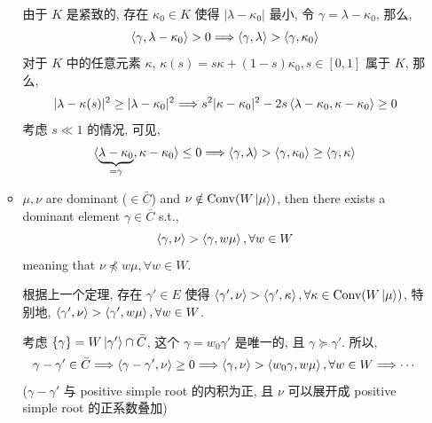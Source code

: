 \begin{itemize}
\begin{itemize}
		\begin{tcolorbox}[title=proof:]
			由于 $K$ 是紧致的, 存在 $\kappa_0 \in K$ 使得 $|\lambda - \kappa_0|$ 最小, 令 $\gamma = \lambda - \kappa_0$, 那么,
			\begin{equation}
				\braket{\gamma, \lambda - \kappa_0} > 0 \Longrightarrow \braket{\gamma, \lambda} > \braket{\gamma, \kappa_0}
			\end{equation}
			对于 $K$ 中的任意元素 $\kappa$, $\kappa(s) = s \kappa + (1 - s) \kappa_0, s \in [0, 1]$ 属于 $K$, 那么,
			\begin{equation}
				|\lambda - \kappa(s)|^2 \geq |\lambda - \kappa_0|^2 \Longrightarrow s^2 |\kappa - \kappa_0|^2 - 2 s \braket{\lambda - \kappa_0, \kappa - \kappa_0} \geq 0
			\end{equation}
			考虑 $s \ll 1$ 的情况, 可见,
			\begin{equation}
				\braket{\underbrace{\lambda - \kappa_0}_{= \gamma}, \kappa - \kappa_0} \leq 0 \Longrightarrow \braket{\gamma, \lambda} > \braket{\gamma, \kappa_0} \geq \braket{\gamma, \kappa}
			\end{equation}
		\end{tcolorbox}
		
		\item $\mu, \nu$ are dominant ($\in \bar{C}$) and $\nu \notin \mathrm{Conv}(W \ket{\mu})$, then there exists a dominant element $\gamma \in \bar{C}$ s.t.,
		\begin{equation}
			\braket{\gamma, \nu} > \braket{\gamma, w \mu}, \forall w \in W
		\end{equation}
		meaning that $\nu \npreceq w \mu, \forall w \in W$.
		
		\begin{tcolorbox}[title=proof:]
			根据上一个定理, 存在 $\gamma' \in E$ 使得 $\braket{\gamma', \nu} > \braket{\gamma', \kappa}, \forall \kappa \in \mathrm{Conv}(W \ket{\mu})$, 特别地, $\braket{\gamma', \nu} > \braket{\gamma', w \mu}, \forall w \in W$.
			
			考虑 $\{\gamma\} = W \ket{\gamma'} \cap \bar{C}$, 这个 $\gamma = w_0 \gamma'$ 是唯一的, 且 $\gamma \succeq \gamma'$. 所以,
			\begin{equation}
				\gamma - \gamma' \in \bar{C} \Longrightarrow \braket{\gamma - \gamma', \nu} \geq 0 \Longrightarrow \braket{\gamma, \nu} > \braket{w_0 \gamma, w \mu}, \forall w \in W \Longrightarrow \cdots
			\end{equation}
			($\gamma - \gamma'$ 与 positive simple root 的内积为正, 且 $\nu$ 可以展开成 positive simple root 的正系数叠加)
		\end{tcolorbox}
	\end{itemize}
	

\end{itemize}
